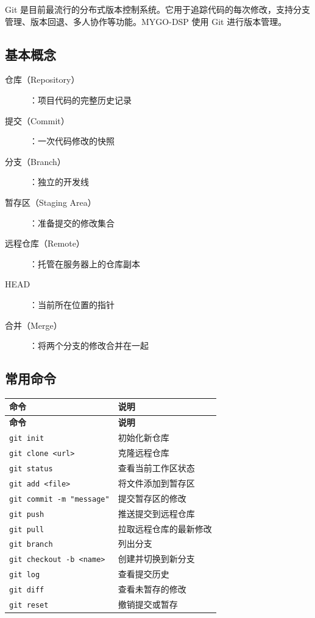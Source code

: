 ﻿\documentclass[12pt,a4paper,oneside]{ctexbook}
\begin{document}
Git 是目前最流行的分布式版本控制系统。它用于追踪代码的每次修改，支持分支管理、版本回退、多人协作等功能。MYGO-DSP 使用 Git 进行版本管理。

\subsection{基本概念}

\begin{description}
    \item[仓库（Repository）]：项目代码的完整历史记录
    \item[提交（Commit）]：一次代码修改的快照
    \item[分支（Branch）]：独立的开发线
    \item[暂存区（Staging Area）]：准备提交的修改集合
    \item[远程仓库（Remote）]：托管在服务器上的仓库副本
    \item[HEAD]：当前所在位置的指针
    \item[合并（Merge）]：将两个分支的修改合并在一起
\end{description}

\subsection{常用命令}

\begin{longtable}{p{5cm}p{8cm}}
    \toprule
    \textbf{命令} & \textbf{说明} \\
    \midrule
    \endfirsthead
    \toprule
    \textbf{命令} & \textbf{说明} \\
    \midrule
    \endhead
    \bottomrule
    \endfoot
    \texttt{git init} & 初始化新仓库 \\
    \texttt{git clone <url>} & 克隆远程仓库 \\
    \texttt{git status} & 查看当前工作区状态 \\
    \texttt{git add <file>} & 将文件添加到暂存区 \\
    \texttt{git commit -m "message"} & 提交暂存区的修改 \\
    \texttt{git push} & 推送提交到远程仓库 \\
    \texttt{git pull} & 拉取远程仓库的最新修改 \\
    \texttt{git branch} & 列出分支 \\
    \texttt{git checkout -b <name>} & 创建并切换到新分支 \\
    \texttt{git log} & 查看提交历史 \\
    \texttt{git diff} & 查看未暂存的修改 \\
    \texttt{git reset} & 撤销提交或暂存 \\
    \bottomrule
\end{longtable}
\end{document}
